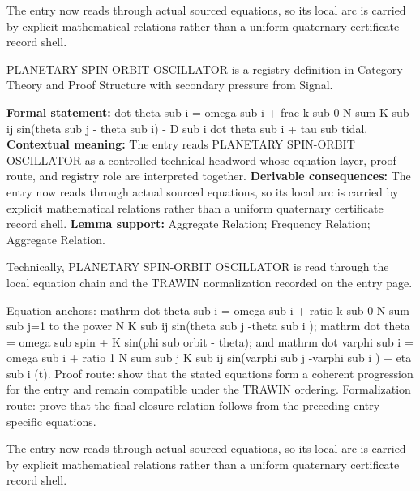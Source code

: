 The entry now reads through actual sourced equations, so its local arc is carried by explicit mathematical relations rather than a uniform quaternary certificate record shell.
\clearpage


\begingroup\small
{}
PLANETARY SPIN-ORBIT OSCILLATOR is a registry definition in Category Theory and Proof Structure with secondary pressure from Signal.

\begingroup\footnotesize\setlength{\emergencystretch}{3em}\sloppy
\textbf{Formal statement:} dot theta sub i = omega sub i + frac k sub 0 N sum K sub ij sin(theta sub j - theta sub i) - D sub i dot theta sub i + tau sub tidal. \textbf{Contextual meaning:} The entry reads PLANETARY SPIN-ORBIT OSCILLATOR as a controlled technical headword whose equation layer, proof route, and registry role are interpreted together. \textbf{Derivable consequences:} The entry now reads through actual sourced equations, so its local arc is carried by explicit mathematical relations rather than a uniform quaternary certificate record shell. \textbf{Lemma support:} Aggregate Relation; Frequency Relation; Aggregate Relation.\par
\endgroup

Technically, PLANETARY SPIN-ORBIT OSCILLATOR is read through the local equation chain and the TRAWIN normalization recorded on the entry page.

Equation anchors: mathrm dot theta sub i = omega sub i + ratio k sub 0 N sum sub j=1 to the power N K sub ij sin(theta sub j -theta sub i ); mathrm dot theta = omega sub spin + K sin(phi sub orbit - theta); and mathrm dot varphi sub i = omega sub i + ratio 1 N sum sub j K sub ij sin(varphi sub j -varphi sub i ) + eta sub i (t). Proof route: show that the stated equations form a coherent progression for the entry and remain compatible under the TRAWIN ordering. Formalization route: prove that the final closure relation follows from the preceding entry-specific equations.

The entry now reads through actual sourced equations, so its local arc is carried by explicit mathematical relations rather than a uniform quaternary certificate record shell.
\endgroup

